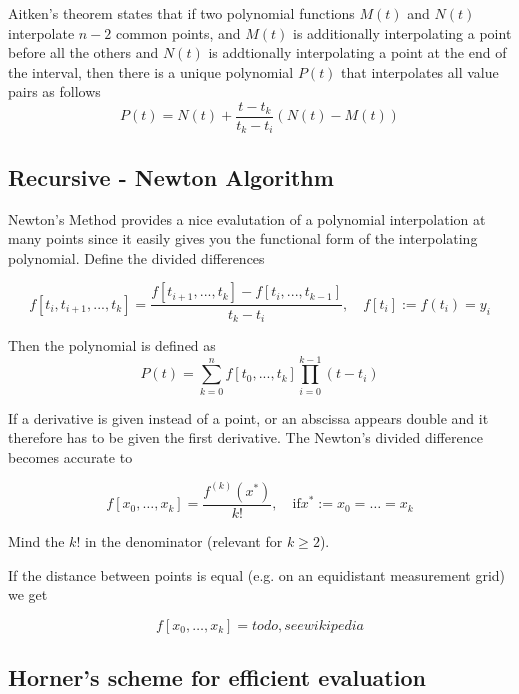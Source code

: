 \documentclass[
    a4paper,
    11pt
]{article}
\begin{document}
Aitken's theorem states that if two polynomial functions $M(t)$ and $N(t)$
interpolate $n-2$ common points, and $M(t)$ is additionally interpolating a
point before all the others and $N(t)$ is addtionally interpolating a point at
the end of the interval, then there is a unique polynomial $P(t)$ that
interpolates all value pairs as follows
\begin{equation}
    P(t) = N(t) + \frac{t - t_k}{t_k - t_i} (N(t) - M(t))
\end{equation}

\subsection{Recursive - Newton Algorithm}

Newton's Method provides a nice evalutation of a polynomial interpolation at
many points since it easily gives you the functional form of the interpolating
polynomial. Define the divided differences

\begin{equation}
    f[t_i, t_{i+1}, ..., t_k] =
    \frac{f[t_{i+1}, ..., t_k] - f[t_i, ..., t_{k-1}]}{t_k - t_i},
    \quad
    f[t_i] := f(t_i) = y_i
\end{equation}

Then the polynomial is defined as
\begin{equation}
    P(t) = \sum_{k=0}^{n} f[t_0, ..., t_k] \prod_{i=0}^{k-1}(t - t_i)
\end{equation}

If a derivative is given instead of a point, or an abscissa appears double and
it therefore has to be given the first derivative. The Newton's divided
difference becomes accurate to

\begin{equation}
    f[x_0, \dots, x_k] = \frac{f^{(k)}(x^*)}{k!}, \quad \text{if} x^* := x_0 =
    \dots = x_k
\end{equation}

Mind the $k!$ in the denominator (relevant for $k \geq 2$).

If the distance between points is equal (e.g. on an equidistant measurement
grid) we get

\begin{equation}
    f[x_0, \dots, x_k] = todo, see wikipedia
\end{equation}

\subsection{Horner's scheme for efficient evaluation}
\end{document}
